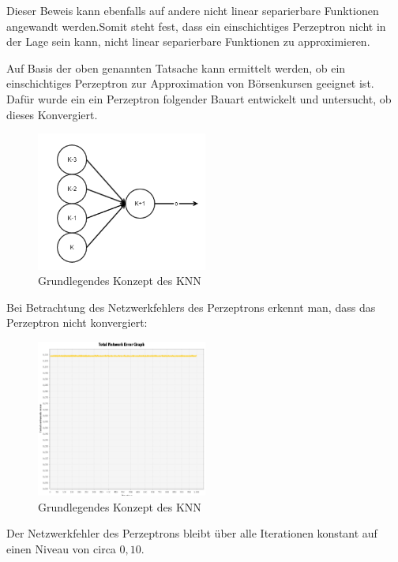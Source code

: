 Dieser Beweis kann ebenfalls auf andere nicht linear separierbare Funktionen angewandt werden.Somit steht fest, dass ein einschichtiges Perzeptron nicht in der Lage sein kann, nicht linear separierbare Funktionen zu approximieren.

Auf Basis der oben genannten Tatsache kann ermittelt werden, ob ein einschichtiges Perzeptron zur Approximation von Börsenkursen geeignet ist. Dafür wurde ein ein Perzeptron folgender Bauart entwickelt und untersucht, ob dieses Konvergiert.

\begin{figure}[H]
\centering
		\includegraphics[width=0.5\textwidth]{Testperzeptron.PNG}
	\caption{Grundlegendes Konzept des KNN}
	\label{fig:Grundlegendes Konzept des KNN}
\end{figure}

Bei Betrachtung des Netzwerkfehlers des Perzeptrons erkennt man, dass das Perzeptron nicht konvergiert:

\begin{figure}[H]
\centering
		\includegraphics[width=0.5\textwidth]{MSEperzeptron.PNG}
	\caption{Grundlegendes Konzept des KNN}
	\label{fig:Grundlegendes Konzept des KNN}
\end{figure}

Der Netzwerkfehler des Perzeptrons bleibt über alle Iterationen konstant auf einen Niveau von circa $0,10$.

